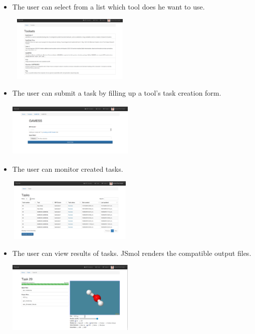 \documentclass[journal]{./IEEE/IEEEtran}
\begin{document}
\begin{itemize}
		\item The user can select from a list which tool does he want to use. \newline	
		\begin{center}			
			\includegraphics[width=230px,height=120px]{./images/toolset_list.png}			
		\end{center}
		
		\item The user can submit a task by filling up a tool's task creation form. \newline
		\begin{center}			
			\includegraphics[width=230px,height=100px]{./images/gamess_form.png}			
		\end{center}	
		
		\item The user can monitor created tasks. \newline
		\begin{center}			
			\includegraphics[width=230px,height=115px]{./images/tasks_list_view.png}			
		\end{center}	
		\item The user can view results of tasks. JSmol renders the compatible output files\cite{IJCH:IJCH201300024}. \newline
		\begin{center}			
			\includegraphics[width=230px,height=130px]{./images/jsmol_detail_view.png}			
		\end{center}	

		    
		
	\end{itemize}
	
\end{document}
